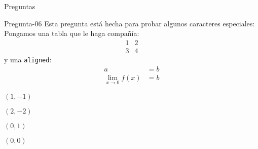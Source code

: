 \documentclass[a4,11pt]{aleph-notas}
\begin{document}
\begin{quiz}{Preguntas}
\begin{multi}[]%
    {Pregunta-06}
    Esta pregunta está hecha para probar algunos caracteres especiales:  Pongamos una tabla que le haga compañía:
    \[
        \begin{array}{c|c}
            1 & 2 \\\hline
            3 & 4
        \end{array}
    \]
    y una \texttt{aligned}:
    \[
        \begin{aligned}
            a & = b\\
            \lim_{x\to0 }f(x) & = b
        \end{aligned}
    \]
    \item $(1,-1)$
    \item $(2,-2)$
    \item $(0,1)$
    \item* $(0,0)$
\end{multi}

\end{quiz}
\end{document}
